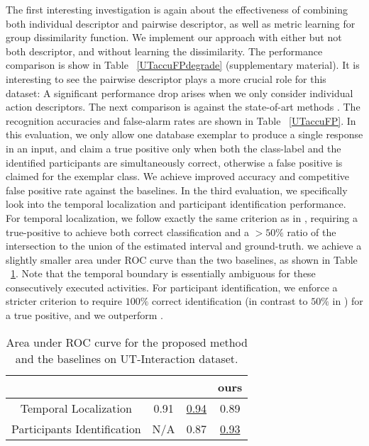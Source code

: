 The first interesting investigation is again about the effectiveness of combining both individual descriptor and pairwise descriptor, as well as metric learning for group dissimilarity function. We implement our approach with either but not both descriptor, and without learning the dissimilarity. The performance comparison is show in Table ~\ref{UTaccuFPdegrade} (supplementary material). It is interesting to see the pairwise descriptor plays a more crucial role for this dataset: A significant performance drop arises when we only consider individual action descriptors. The next comparison is against the state-of-art methods \cite{Ryoo:group,Amer:group}. The recognition accuracies and false-alarm rates are shown in Table ~\ref{UTaccuFP}. In this evaluation, we only allow one database exemplar to produce a single response in an input, and claim a true positive only when both the class-label and the identified participants are simultaneously correct, otherwise a false positive is claimed for the exemplar class. We achieve improved accuracy and competitive false positive rate against the baselines. In the third evaluation, we specifically look into the temporal localization and participant identification performance. For temporal localization, we follow exactly the same criterion as in \cite{Amer:group}, requiring a true-positive to achieve both correct classification and a $>50\%$ ratio of the intersection to the union of the estimated interval and ground-truth. we achieve a slightly smaller area under ROC curve than the two baselines, as shown in Table ~\ref{UTarea}. Note that the temporal boundary is essentially ambiguous for these consecutively executed activities. For participant identification, we enforce a stricter criterion to require $100\%$ correct identification (in contrast to $50\%$ in \cite{Amer:group}) for a true positive, and we outperform \cite{Amer:group}. 

\begin{table}[ht]
\centering \caption{Area under ROC curve for the proposed method and the baselines on UT-Interaction dataset.}
\footnotesize{
\begin{tabular}{|c|c|c|c|}
\hline   & \cite{Ryoo:group} &  \cite{Amer:group}  &   ours \\
\hline Temporal Localization &  0.91 & \underline{0.94} &  0.89\\
\hline Participants Identification &  N/A & 0.87 &  \underline{0.93}   \\
\hline 
\end{tabular}
}
\label{UTarea}
\end{table}

